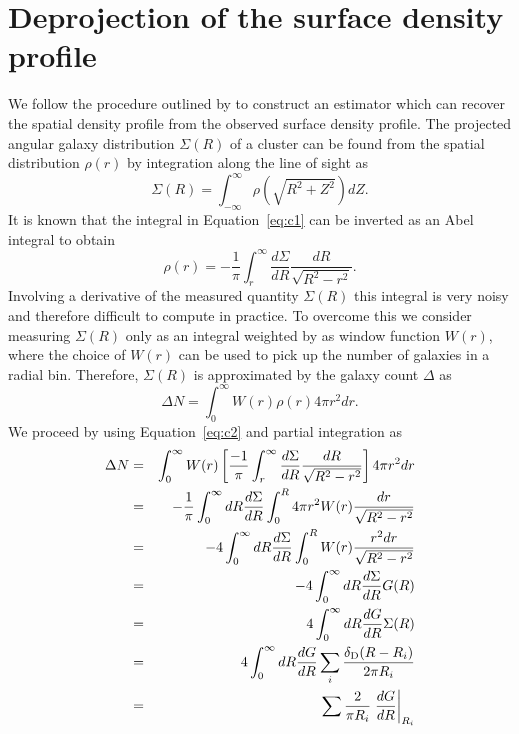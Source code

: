 \documentclass[a4paper,fleqn,usenatbib]{mnras}
\begin{document}
\section{Deprojection of the surface density profile}
\label{sec:deprojection_math}
We follow the procedure outlined by \citet{eisenstein2003deprojecting} to construct an estimator which can recover the spatial density profile from the observed surface density profile. The projected angular galaxy distribution $\Sigma(R)$ of a cluster can be found from the spatial distribution $\rho(r)$ by integration along the line of sight as
\begin{equation}
\Sigma(R)=\int_{-\infty}^{\infty} \rho(\sqrt{R^2+Z^2})dZ. \label{eq:c1}
\end{equation}
It is known that the integral in Equation~\ref{eq:c1} can be inverted as an Abel integral to obtain
\begin{equation}
\rho(r) = -\frac{1}{\pi} \int_{r}^{\infty} \frac{d\Sigma}{dR}\frac{dR}{\sqrt{R^2-r^2}}. \label{eq:c2}
\end{equation}
Involving a derivative of the measured quantity $\Sigma(R)$ this integral is very noisy and therefore difficult to compute in practice. To overcome this we consider measuring $\Sigma(R)$ only as an integral weighted by as window function $W(r)$, where the choice of $W(r)$ can be used to pick up the number of galaxies in a radial bin. Therefore, $\Sigma(R)$ is approximated by the galaxy count $\Delta$ as  
\begin{equation}
\Delta N = \int_{0}^{\infty} W(r) \rho(r) 4 \pi r^2 dr.
\end{equation}
We proceed by using Equation~\ref{eq:c2} and partial integration as
\begin{align}
\Delta N &=& \int_{0}^{\infty} W(r) \left[ \frac{-1}{\pi} \int_{r}^{\infty} \frac{d\Sigma}{dR}\frac{dR}{\sqrt{R^2-r^2}} \right] 4 \pi r^2 dr  \label{eq:rho} \\
&=& -\frac{1}{\pi} \int_{0}^{\infty} dR \frac{d\Sigma}{dR} \int_{0}^{R} 4 \pi r^2 W(r) \frac{dr}{\sqrt{R^2-r^2}}\\
&=& -4 \int_{0}^{\infty} dR \frac{d\Sigma}{dR} \int_{0}^{R} W(r) \frac{r^2 dr}{\sqrt{R^2-r^2}} \\
&=& -4 \int_{0}^{\infty} dR \frac{d\Sigma}{dR} G(R)\\
&=& 4 \int_{0}^{\infty} dR \frac{dG}{dR} \Sigma(R) \label{eq:parts}\\
&=& 4 \int_{0}^{\infty} dR \frac{dG}{dR} \sum_i \frac{\delta_{\rm D}(R-R_i)}{2\pi R_i} \label{eq:discrete} \\
&=& \sum \frac{2}{\pi R_i} \left.\frac{dG}{dR}\right|_{R_i}
\end{align}
\end{document}
